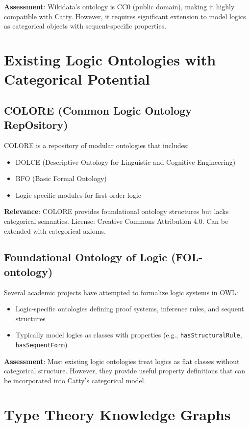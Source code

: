 \textbf{Assessment}: Wikidata's ontology is CC0 (public domain), making it highly compatible with Catty. However, it requires significant extension to model logics as categorical objects with sequent-specific properties.

\section{Existing Logic Ontologies with Categorical Potential}

\subsection{COLORE (Common Logic Ontology RepOsitory)}

COLORE is a repository of modular ontologies that includes:
\begin{itemize}
  \item DOLCE (Descriptive Ontology for Linguistic and Cognitive Engineering)
  \item BFO (Basic Formal Ontology)
  \item Logic-specific modules for first-order logic
\end{itemize}

\textbf{Relevance}: COLORE provides foundational ontology structures but lacks categorical semantics. License: Creative Commons Attribution 4.0. Can be extended with categorical axioms.

\subsection{Foundational Ontology of Logic (FOL-ontology)}

Several academic projects have attempted to formalize logic systems in OWL:
\begin{itemize}
  \item Logic-specific ontologies defining proof systems, inference rules, and sequent structures
  \item Typically model logics as classes with properties (e.g., \texttt{hasStructuralRule}, \texttt{hasSequentForm})
\end{itemize}

\textbf{Assessment}: Most existing logic ontologies treat logics as flat classes without categorical structure. However, they provide useful property definitions that can be incorporated into Catty's categorical model.

\section{Type Theory Knowledge Graphs}

